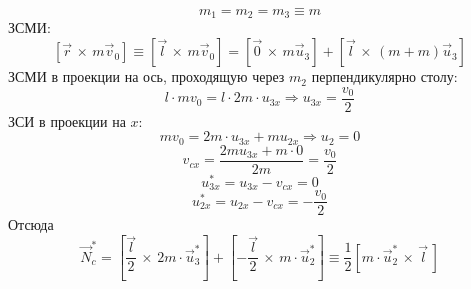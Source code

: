 \documentclass[a5paper,10pt]{article}
\begin{document}
\begin{equation*}
    m_1=m_2=m_3\equiv m
\end{equation*}
ЗСМИ:
\begin{equation}
    \label{eq1}
    [\vec{r}\,\times\,{m\vec{v}_0}]
    \equiv [\vec{l}\,\times\,{m\vec{v}_0}]=
    [\vec{0}\,\times\,{m\vec{u}_3}]+
    [\vec{l}\,\times\,{(m+m)\vec{u}_3}]
\end{equation}
ЗСМИ в проекции на ось, проходящую через $m_2$ перпендикулярно столу:
\begin{equation}
    \label{eq:zsmi}
    l\cdot mv_0 = 
                l\cdot 2m\cdot u_{3x}
                \Rightarrow
                u_{3x}=\frac{v_0}{2}
\end{equation}
ЗСИ в проекции на $x$:
\begin{equation}
    mv_0=
        2m\cdot u_{3x}+mu_{2x}
        \Rightarrow
        u_{2}=0 
\end{equation}
\begin{equation}
    v_{cx}=
            \frac{2mu_{3x}+
            m\cdot0}{2m}=
            \frac{v_0}{2}
\end{equation}
\begin{equation}
    u_{3x}^*=
        u_{3x}-v_{cx}=
        0
\end{equation}
\begin{equation}
    u_{2x}^*=
            u_{2x}-v_{cx}=
            -\frac{v_0}{2}
\end{equation}
Отсюда
\begin{equation}
    \vec{N}_c^*=
        \left[\frac{\vec{l}}{2} \,\times\, 2m\cdot \vec{u}_{3}^*\right]+
        \left[-\frac{\vec{l}}{2} \,\times\, m\cdot \vec{u}_{2}^*\right]
        \equiv
        \frac{1}{2}\left[m\cdot \vec{u}_{2}^* \,\times\, \vec{l}\,\right]
\end{equation}
\end{document}
